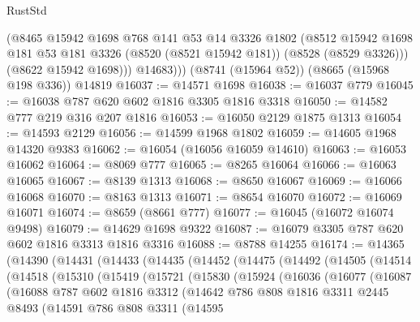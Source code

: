 \begin{lexlean}{RustStd}
\begin{coremodule}
            (@8465
              @15942
              @1698
              @768
              @141
              @53
              @14
              @3326
              @1802
              (@8512
                @15942
                @1698
                @181
                @53
                @181
                @3326
                (@8520 (@8521 @15942 @181))
                (@8528 (@8529 @3326)))
              (@8622 @15942 @1698)))
          @14683)))
    (@8741 (@15964 @52))
    (@8665 (@15968 @198 @336))
    @14819
@16037 := @14571 @1698
@16038 := @16037 @779
@16045 := @16038 @787 @620 @602 @1816 @3305 @1816 @3318
@16050 := @14582 @777 @219 @316 @207 @1816
@16053 := @16050 @2129 @1875 @1313
@16054 := @14593 @2129
@16056 := @14599 @1968 @1802
@16059 := @14605 @1968 @14320 @9383
@16062 := @16054 (@16056 @16059 @14610)
@16063 := @16053 @16062
@16064 := @8069 @777
@16065 := @8265 @16064
@16066 := @16063 @16065
@16067 := @8139 @1313
@16068 := @8650 @16067
@16069 := @16066 @16068
@16070 := @8163 @1313
@16071 := @8654 @16070
@16072 := @16069 @16071
@16074 := @8659 (@8661 @777)
@16077 := @16045 (@16072 @16074 @9498)
@16079 := @14629 @1698 @9322
@16087 := @16079 @3305 @787 @620 @602 @1816 @3313 @1816 @3316
@16088 := @8788 @14255
@16174 := @14365
    (@14390
      (@14431
        (@14433
          (@14435
            (@14452
              (@14475
                (@14492
                  (@14505
                    (@14514
                      (@14518
                        (@15310
                          (@15419
                            (@15721
                              (@15830
                                (@15924
                                  (@16036
                                    (@16077
                                      (@16087
                                        (@16088
                                          @787
                                          @602
                                          @1816
                                          @3312
                                          (@14642
                                            @786
                                            @808
                                            @1816
                                            @3311
                                            @2445
                                            @8493
                                            (@14591
                                              @786
                                              @808
                                              @3311
                                              (@14595

\end{coremodule}
\end{lexlean}
